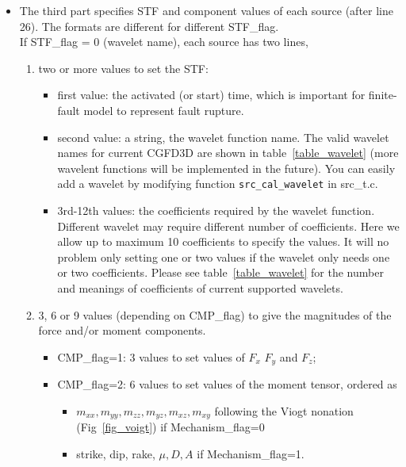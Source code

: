 \begin{itemize}
    \item The third part specifies STF and component values of each source (after line 26).
        The formats are different for different STF\_flag. \\
        If STF\_flag = 0 (wavelet name), each source has two lines,
        \begin{enumerate}
            \item two or more values to set the STF:
            \begin{itemize}
                \item first value: the activated (or start) time, which is important for finite-fault model to represent fault rupture.
                \item second value: a string, the wavelet function name.
                      The valid wavelet names for current CGFD3D are shown in table~\ref{table_wavelet}
                      (more wavelent functions will be implemented in the future). You can easily add a wavelet by modifying function
                      \verb|src_cal_wavelet| in src\_t.c.
                \item 3rd-12th values: the coefficients required by the wavelet function.
                      Different wavelet may require different number of coefficients.
                      Here we allow up to maximum 10 coefficients to specify the values.
                      It will no problem only setting one or two values if the wavelet only needs one or two coefficients.
                      Please see table~\ref{table_wavelet} for the number and meanings of coefficients of current supported wavelets.
            \end{itemize}
            \item 3, 6 or 9 values (depending on CMP\_flag) to give the magnitudes of the force and/or moment components.
                \begin{itemize}
                    \item CMP\_flag=1: 3 values to set values of $F_x$ $F_y$ and $F_z$;
                    \item CMP\_flag=2: 6 values to set values of the moment tensor, ordered as 
                        \begin{itemize}
                            \item $m_{xx},m_{yy},m_{zz},m_{yz},m_{xz},m_{xy}$ following the 
                                  Viogt nonation (Fig~\ref{fig_voigt}) if Mechanism\_flag=0
                            \item strike, dip, rake, $\mu, D, A$ if Mechanism\_flag=1.

\end{itemize}
\end{itemize}
\end{enumerate}
\end{itemize}
